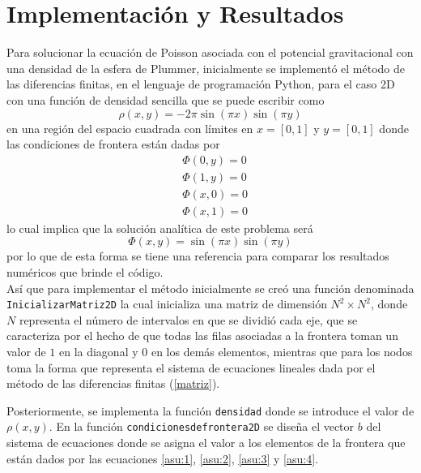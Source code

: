 \documentclass[reprint,amsmath,amssymb,aps]{revtex4-2}
\begin{document}
\section{Implementación y Resultados}
Para solucionar la ecuación de Poisson asociada con el potencial gravitacional con una densidad de la esfera de Plummer, inicialmente se implementó el método de las diferencias finitas, en el lenguaje de programación Python, para el caso 2D con una función de densidad sencilla que se puede escribir como
\begin{equation}
    \rho(x,y)=-2\pi \sin(\pi x) \sin (\pi y)
\end{equation}
en una región del espacio cuadrada con límites en $x=[0,1]$ y $y=[0,1]$ donde las condiciones de frontera están dadas por
\begin{eqnarray}
&\varPhi(0,y)=0 \label{asu:1}\\
&\varPhi(1,y)=0 \label{asu:2}\\
&\varPhi(x,0)=0 \label{asu:3}\\
&\varPhi(x,1)=0 \label{asu:4}
\end{eqnarray}
lo cual implica que la solución analítica de este problema será 
\begin{equation}
\varPhi(x,y)=\sin(\pi x) \sin (\pi y) \label{asu:5}
\end{equation}
por lo que de esta forma se tiene una referencia para comparar los resultados numéricos que brinde el código.\\

Así que para implementar el método inicialmente se creó una función denominada \texttt{InicializarMatriz2D} la cual inicializa una matriz de dimensión $N^2 \times  N^2$, donde $N$ representa el número de intervalos en que se dividió cada eje, que se caracteriza por el hecho de que todas las filas asociadas a la frontera toman un valor de $1$ en la diagonal y $0$ en los demás elementos, mientras que para los nodos toma la forma que representa el sistema de ecuaciones lineales dada por el método de las diferencias finitas (\ref{matriz}).

Posteriormente, se implementa la función \texttt{densidad} donde se introduce el valor de $\rho(x,y)$. En la función \texttt{condicionesdefrontera2D} se diseña el vector $b$ del sistema de ecuaciones donde se asigna el valor a los elementos de la frontera que están dados por las ecuaciones \ref{asu:1}, \ref{asu:2}, \ref{asu:3} y \ref{asu:4}. \\
\end{document}
